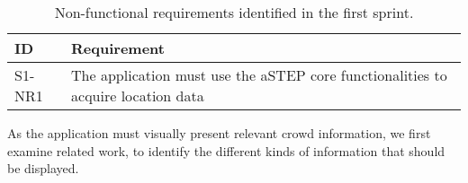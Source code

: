\begin{table}[h!]
	\centering
	\begin{tabularx}{\textwidth}{lX}
		\toprule
		\textbf{ID} & \textbf{Requirement} \\
		\midrule 
		\rowcolor[HTML]{EFEFEF} 
		S1-NR1 & The application must use the aSTEP core functionalities to acquire location data \\
		\bottomrule
	\end{tabularx}
	\caption{Non-functional requirements identified in the first sprint.}
	\label{tab:s1_nreqs}
\end{table}

As the application must visually present relevant crowd information, we first examine related work, to identify the different kinds of information that should be displayed.